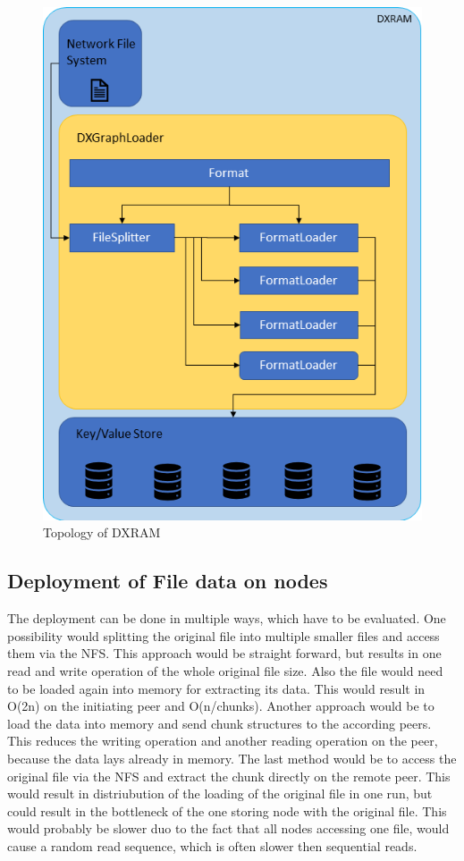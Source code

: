 \begin{figure}[H]
	\centering
	\includegraphics[width=1.0\linewidth]{img/layout.png}
	\caption{Topology of DXRAM}
	\label{topology}
\end{figure}


\subsection{Deployment of File data on nodes}
The deployment can be done in multiple ways, which have to be evaluated. One possibility would splitting the original file into multiple smaller files and access them via the NFS. This approach would be straight forward, but results in one read and write operation of the whole original file size. Also the file would need to be loaded again into memory for extracting its data. This would result in O(2n) on the initiating peer and O(n/chunks).
Another approach would be to load the data into memory and send chunk structures to the according peers. This reduces the writing operation and another reading operation on the peer, because the data lays already in memory.
The last method would be to access the original file via the NFS and extract the chunk directly on the remote peer. This would result in distriubution of the loading of the original file in one run, but could result in the bottleneck of the one storing node with the original file. This would probably be slower duo to the fact that all nodes accessing one file, would cause a random read sequence, which is often slower then sequential reads.


